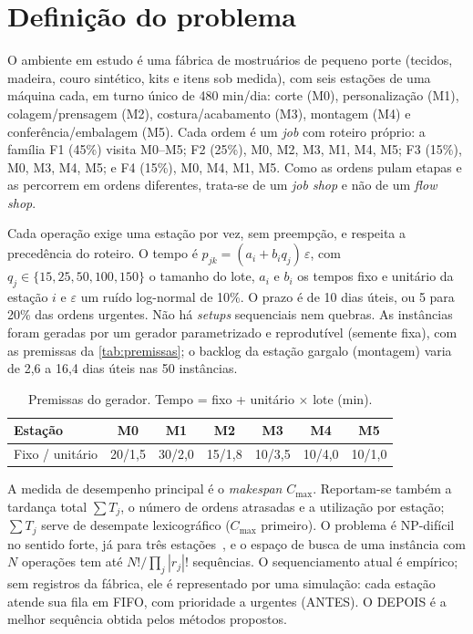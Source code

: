\section{Definição do problema}

O ambiente em estudo é uma fábrica de mostruários de pequeno porte (tecidos, madeira, couro sintético, kits e itens sob medida), com seis estações de uma máquina cada, em turno único de 480 min/dia: corte (M0), personalização (M1), colagem/prensagem (M2), costura/acabamento (M3), montagem (M4) e conferência/embalagem (M5). Cada ordem é um \textit{job} com roteiro próprio: a família F1 (45\%) visita M0--M5; F2 (25\%), M0, M2, M3, M1, M4, M5; F3 (15\%), M0, M3, M4, M5; e F4 (15\%), M0, M4, M1, M5. Como as ordens pulam etapas e as percorrem em ordens diferentes, trata-se de um \textit{job shop} e não de um \textit{flow shop}.

Cada operação exige uma estação por vez, sem preempção, e respeita a precedência do roteiro. O tempo é $p_{jk} = (a_i + b_i q_j)\,\varepsilon$, com $q_j \in \{15,25,50,100,150\}$ o tamanho do lote, $a_i$ e $b_i$ os tempos fixo e unitário da estação $i$ e $\varepsilon$ um ruído log-normal de 10\%. O prazo é de 10 dias úteis, ou 5 para 20\% das ordens urgentes. Não há \textit{setups} sequenciais nem quebras. As instâncias foram geradas por um gerador parametrizado e reprodutível (semente fixa), com as premissas da \autoref{tab:premissas}; o backlog da estação gargalo (montagem) varia de 2,6 a 16,4 dias úteis nas 50 instâncias.

\begin{table}[htb]
    \centering
    \caption{\label{tab:premissas} Premissas do gerador. Tempo = fixo + unitário $\times$ lote (min).}
    \footnotesize
    \begin{tabular}{lcccccc}
        \toprule
        Estação & M0 & M1 & M2 & M3 & M4 & M5 \\
        \midrule
        Fixo / unitário & 20/1,5 & 30/2,0 & 15/1,8 & 10/3,5 & 10/4,0 & 10/1,0 \\
        \bottomrule
    \end{tabular}
\end{table}

A medida de desempenho principal é o \textit{makespan} $C_{\max}$. Reportam-se também a tardança total $\sum T_j$, o número de ordens atrasadas e a utilização por estação; $\sum T_j$ serve de desempate lexicográfico ($C_{\max}$ primeiro). O problema é NP-difícil no sentido forte, já para três estações~\cite{garey1976complexity}, e o espaço de busca de uma instância com $N$ operações tem até $N!/\prod_j |r_j|!$ sequências. O sequenciamento atual é empírico; sem registros da fábrica, ele é representado por uma simulação: cada estação atende sua fila em FIFO, com prioridade a urgentes (ANTES). O DEPOIS é a melhor sequência obtida pelos métodos propostos.

